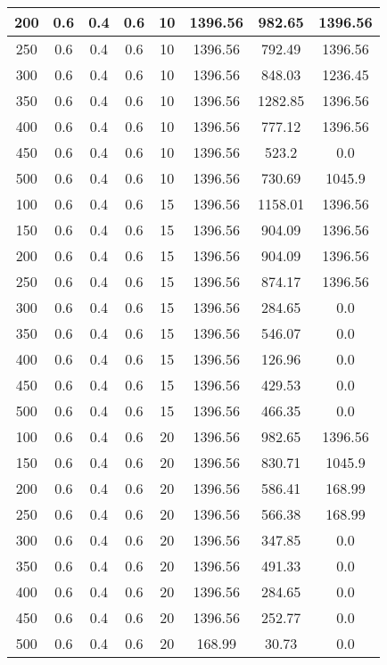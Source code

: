 \documentclass[a4paper, 12pt]{extreport}
\begin{document}
\begin{itemize}
\begin{longtable}{|c|c|c|c|c|c|c|c|}
			200 & 0.6 & 0.4 & 0.6 & 10 & 1396.56 & 982.65 & 1396.56 \\\hline
			250 & 0.6 & 0.4 & 0.6 & 10 & 1396.56 & 792.49 & 1396.56 \\\hline
			300 & 0.6 & 0.4 & 0.6 & 10 & 1396.56 & 848.03 & 1236.45 \\\hline
			350 & 0.6 & 0.4 & 0.6 & 10 & 1396.56 & 1282.85 & 1396.56 \\\hline
			400 & 0.6 & 0.4 & 0.6 & 10 & 1396.56 & 777.12 & 1396.56 \\\hline
			450 & 0.6 & 0.4 & 0.6 & 10 & 1396.56 & 523.2 & 0.0 \\\hline
			500 & 0.6 & 0.4 & 0.6 & 10 & 1396.56 & 730.69 & 1045.9 \\\hline
			100 & 0.6 & 0.4 & 0.6 & 15 & 1396.56 & 1158.01 & 1396.56 \\\hline
			150 & 0.6 & 0.4 & 0.6 & 15 & 1396.56 & 904.09 & 1396.56 \\\hline
			200 & 0.6 & 0.4 & 0.6 & 15 & 1396.56 & 904.09 & 1396.56 \\\hline
			250 & 0.6 & 0.4 & 0.6 & 15 & 1396.56 & 874.17 & 1396.56 \\\hline
			300 & 0.6 & 0.4 & 0.6 & 15 & 1396.56 & 284.65 & 0.0 \\\hline
			350 & 0.6 & 0.4 & 0.6 & 15 & 1396.56 & 546.07 & 0.0 \\\hline
			400 & 0.6 & 0.4 & 0.6 & 15 & 1396.56 & 126.96 & 0.0 \\\hline
			450 & 0.6 & 0.4 & 0.6 & 15 & 1396.56 & 429.53 & 0.0 \\\hline
			500 & 0.6 & 0.4 & 0.6 & 15 & 1396.56 & 466.35 & 0.0 \\\hline
			100 & 0.6 & 0.4 & 0.6 & 20 & 1396.56 & 982.65 & 1396.56 \\\hline
			150 & 0.6 & 0.4 & 0.6 & 20 & 1396.56 & 830.71 & 1045.9 \\\hline
			200 & 0.6 & 0.4 & 0.6 & 20 & 1396.56 & 586.41 & 168.99 \\\hline
			250 & 0.6 & 0.4 & 0.6 & 20 & 1396.56 & 566.38 & 168.99 \\\hline
			300 & 0.6 & 0.4 & 0.6 & 20 & 1396.56 & 347.85 & 0.0 \\\hline
			350 & 0.6 & 0.4 & 0.6 & 20 & 1396.56 & 491.33 & 0.0 \\\hline
			400 & 0.6 & 0.4 & 0.6 & 20 & 1396.56 & 284.65 & 0.0 \\\hline
			450 & 0.6 & 0.4 & 0.6 & 20 & 1396.56 & 252.77 & 0.0 \\\hline
			500 & 0.6 & 0.4 & 0.6 & 20 & 168.99 & 30.73 & 0.0 \\\hline

\end{longtable}
\end{itemize}
\end{document}
